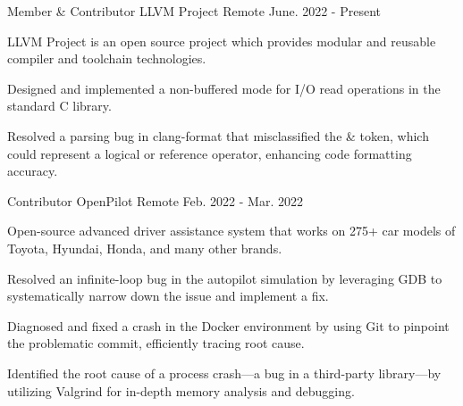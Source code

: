 

\begin{cventries}

  \cventry
    {Member \& Contributor} %
    {LLVM Project} %
    {Remote} %
    {June. 2022 - Present} %
    {
      \begin{cvitems} %
        \item {LLVM Project is an open source project which provides modular and reusable compiler and toolchain technologies.}
        \item {Designed and implemented a non-buffered mode for I/O read operations in the standard C library.}
        \item {Resolved a parsing bug in clang-format that misclassified the \& token, which could represent a logical or reference operator, enhancing code formatting accuracy.}
      \end{cvitems}
    }

  \cventry
    {Contributor} %
    {OpenPilot} %
    {Remote} %
    {Feb. 2022 - Mar. 2022} %
    {
      \begin{cvitems} %
        \item {Open-source advanced driver assistance system that works on 275+ car models of Toyota, Hyundai, Honda, and many other brands.}
        \item {Resolved an infinite-loop bug in the autopilot simulation by leveraging GDB to systematically narrow down the issue and implement a fix.}
        \item {Diagnosed and fixed a crash in the Docker environment by using Git to pinpoint the problematic commit, efficiently tracing root cause.}
        \item {Identified the root cause of a process crash—a bug in a third-party library—by utilizing Valgrind for in-depth memory analysis and debugging.}
      \end{cvitems}
    }


\end{cventries}
